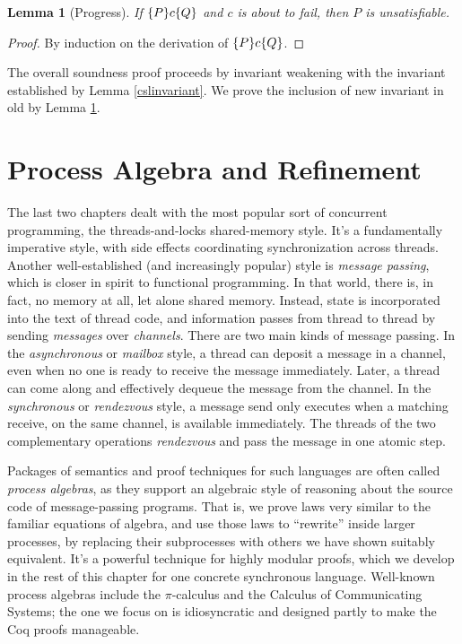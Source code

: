 \documentclass{amsbook}
\newtheorem{lemma}[theorem]{Lemma}
\theoremstyle{definition}
\theoremstyle{remark}
\numberwithin{section}{chapter}
\numberwithin{equation}{chapter}
\begin{document}
\begin{lemma}[Progress]\label{cslprogress}
  If $\{P\} c \{Q\}$ and $c$ is about to fail, then $P$ is unsatisfiable.
\end{lemma}
\begin{proof}
  By induction on the derivation of $\{P\} c \{Q\}$.
\end{proof}

The overall soundness proof proceeds by invariant weakening with the invariant established by Lemma \ref{cslinvariant}.
We prove the inclusion of new invariant in old by Lemma \ref{cslprogress}.



\chapter{\label{process_algebra}Process Algebra and Refinement}

The last two chapters dealt with the most popular sort of concurrent programming, the threads-and-locks shared-memory style.
It's a fundamentally imperative style, with side effects coordinating synchronization across threads.
Another well-established (and increasingly popular) style is \emph{message passing}, which is closer in spirit to functional programming.
In that world, there is, in fact, no memory at all, let alone shared memory.
Instead, state is incorporated into the text of thread code, and information passes from thread to thread by sending \emph{messages} over \emph{channels}.
There are two main kinds of message passing.
In the \emph{asynchronous} or \emph{mailbox} style, a thread can deposit a message in a channel, even when no one is ready to receive the message immediately.
Later, a thread can come along and effectively dequeue the message from the channel.
In the \emph{synchronous} or \emph{rendezvous} style, a message send only executes when a matching receive, on the same channel, is available immediately.
The threads of the two complementary operations \emph{rendezvous} and pass the message in one atomic step.

Packages of semantics and proof techniques for such languages are often called \emph{process algebras}, as they support an algebraic style of reasoning about the source code of message-passing programs.
That is, we prove laws very similar to the familiar equations of algebra, and use those laws to ``rewrite'' inside larger processes, by replacing their subprocesses with others we have shown suitably equivalent.
It's a powerful technique for highly modular proofs, which we develop in the rest of this chapter for one concrete synchronous language.
Well-known process algebras include the $\pi$-calculus and the Calculus of Communicating Systems; the one we focus on is idiosyncratic and designed partly to make the Coq proofs manageable.
\end{document}
